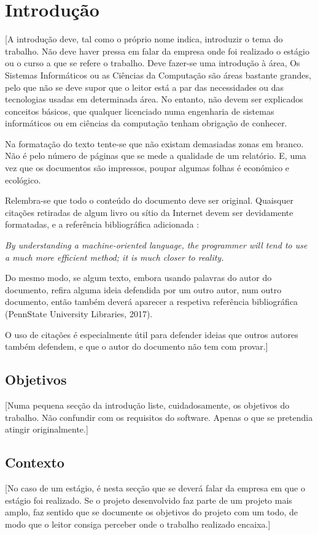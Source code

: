 
\chapter{Introdução}

 [A introdução deve, tal como o próprio nome indica, introduzir o tema do trabalho. Não deve haver pressa em falar da empresa onde foi realizado o estágio ou o curso a que se refere o trabalho. Deve fazer-se uma introdução à área, Os Sistemas Informáticos ou as Ciências da Computação são áreas bastante grandes, pelo que não se deve supor que o leitor está a par das necessidades ou das tecnologias usadas em determinada área. No entanto, não devem ser explicados conceitos básicos, que qualquer licenciado numa engenharia de sistemas informáticos ou em ciências da computação tenham obrigação de conhecer.

 Na formatação do texto tente-se que não existam demasiadas zonas em branco. Não é pelo número de páginas que se mede a qualidade de um relatório. E, uma vez que os documentos são impressos, poupar algumas folhas é económico e ecológico. 

 Relembra-se que todo o conteúdo do documento deve ser original. Quaisquer citações retiradas de algum livro ou sítio da Internet devem ser devidamente formatadas, e a referência bibliográfica adicionada \citep{knuth1973}:
 
 \emph{By understanding a machine-oriented language, the programmer will tend to use a much more efficient method; it is much closer to reality. }

 Do mesmo modo, se algum texto, embora usando palavras do autor do documento, refira alguma ideia defendida por um outro autor, num outro documento, então também deverá aparecer a respetiva referência bibliográfica (PennState University Libraries, 2017). 
 
 

 O uso de citações é especialmente útil para defender ideias que outros autores também defendem, e que o autor do documento não tem com provar.] 

\section{Objetivos}
[Numa pequena secção da introdução liste, cuidadosamente, os objetivos do trabalho. Não confundir com os requisitos do software. Apenas o que se pretendia atingir originalmente.] 
\section{Contexto}
 [No caso de um estágio, é nesta secção que se deverá falar da empresa em que o estágio foi realizado. Se o projeto desenvolvido faz parte de um projeto mais amplo, faz sentido que se documente os objetivos do projeto com um todo, de modo que o leitor consiga perceber onde o trabalho realizado encaixa.] 
